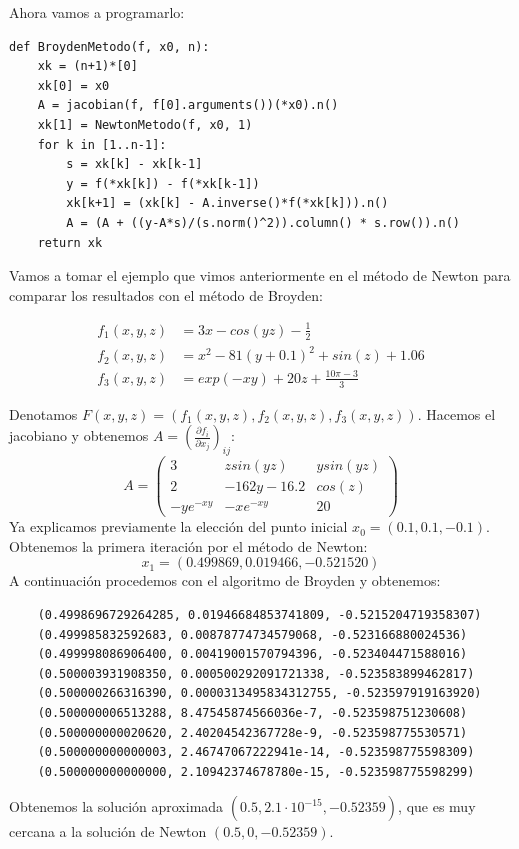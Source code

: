 Ahora vamos a programarlo:

\begin{verbatim}
def BroydenMetodo(f, x0, n):
    xk = (n+1)*[0]
    xk[0] = x0
    A = jacobian(f, f[0].arguments())(*x0).n()
    xk[1] = NewtonMetodo(f, x0, 1)
    for k in [1..n-1]:
        s = xk[k] - xk[k-1]
        y = f(*xk[k]) - f(*xk[k-1])
        xk[k+1] = (xk[k] - A.inverse()*f(*xk[k])).n()
        A = (A + ((y-A*s)/(s.norm()^2)).column() * s.row()).n()
    return xk
\end{verbatim}

\begin{example}
	
	Vamos a tomar el ejemplo que vimos anteriormente en el método de Newton para comparar los resultados con el método de Broyden:
	
	\begin{align*}
		f_1(x,y,z) &= 3x - cos(yz) - \frac{1}{2} \\
		f_2(x,y,z) &= x^2 - 81(y+0.1)^2 + sin(z) + 1.06\\
		f_3(x,y,z) &= exp(-xy) + 20z + \frac{10\pi-3}{3}
	\end{align*}
	
	Denotamos $F(x,y,z) = (f_1(x,y,z),f_2(x,y,z),f_3(x,y,z))$.
	Hacemos el jacobiano y obtenemos $A =(\frac{\partial f_i}{\partial x_j})_{ij}$:
	$$
	A = 
	\begin{pmatrix}
		3 & z sin(yz) & y sin(yz) \\
		2 & -162y-16.2 & cos(z) \\
		-ye^{-xy} & -xe^{-xy} & 20
	\end{pmatrix}
	$$
	Ya explicamos previamente la elección del punto inicial $x_0 = (0.1,0.1,-0.1)$. Obtenemos la primera iteración por el método de Newton: $$x_1 = (0.499869, 0.019466, -0.521520)$$
	A continuación procedemos con el algoritmo de Broyden y obtenemos:
	\begin{verbatim}
	(0.4998696729264285, 0.01946684853741809, -0.5215204719358307)
	(0.499985832592683, 0.00878774734579068, -0.523166880024536)
	(0.499998086906400, 0.00419001570794396, -0.523404471588016)
	(0.500003931908350, 0.000500292091721338, -0.523583899462817)
	(0.500000266316390, 0.0000313495834312755, -0.523597919163920)
	(0.500000006513288, 8.47545874566036e-7, -0.523598751230608)
	(0.500000000020620, 2.40204542367728e-9, -0.523598775530571)
	(0.500000000000003, 2.46747067222941e-14, -0.523598775598309)
	(0.500000000000000, 2.10942374678780e-15, -0.523598775598299)
	\end{verbatim}

	Obtenemos la solución aproximada $(0.5, 2.1 \cdot 10^{-15}, -0.52359)$, que es muy cercana a la solución de Newton $(0.5, 0, -0.52359)$.

\end{example}

